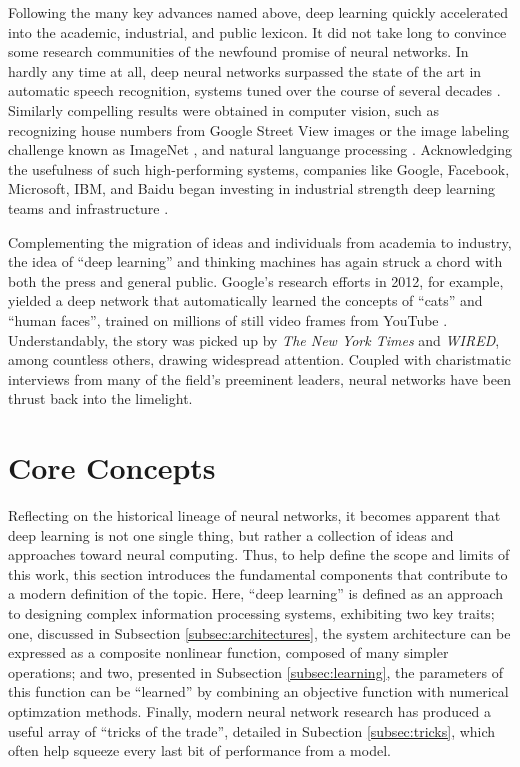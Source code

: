 Following the many key advances named above, deep learning quickly accelerated into the academic, industrial, and public lexicon.
It did not take long to convince some research communities of the newfound promise of neural networks.
In hardly any time at all, deep neural networks surpassed the state of the art in automatic speech recognition, systems tuned over the course of several decades \cite{Hinton2009}.
Similarly compelling results were obtained in computer vision, such as recognizing house numbers from Google Street View images \cite{} or the image labeling challenge known as ImageNet \cite{}, and natural languange processing \cite{Sutskever2010}.
Acknowledging the usefulness of such high-performing systems, companies like Google, Facebook, Microsoft, IBM, and Baidu began investing in industrial strength deep learning teams and infrastructure \cite{Dean2012, LeCun2014}.

Complementing the migration of ideas and individuals from academia to industry, the idea of ``deep learning'' and thinking machines has again struck a chord with both the press and general public.
Google's research efforts in 2012, for example, yielded a deep network that automatically learned the concepts of ``cats'' and ``human faces'', trained on millions of still video frames from YouTube \cite{Le2012}.
Understandably, the story was picked up by \emph{The New York Times} and \emph{WIRED}, among countless others, drawing widespread attention.
Coupled with charistmatic interviews from many of the field's preeminent leaders, neural networks have been thrust back into the limelight. %


\section{Core Concepts}
\label{sec:deep_core}

Reflecting on the historical lineage of neural networks, it becomes apparent that deep learning is not one single thing, but rather a collection of ideas and approaches toward neural computing.
Thus, to help define the scope and limits of this work, this section introduces the fundamental components that contribute to a modern definition of the topic.
Here, ``deep learning'' is defined as an approach to designing complex information processing systems, exhibiting two key traits;
one, discussed in Subsection \ref{subsec:architectures}, the system architecture can be expressed as a composite nonlinear function, composed of many simpler operations;
and two, presented in Subsection \ref{subsec:learning}, the parameters of this function can be ``learned'' by combining an objective function with numerical optimzation methods.
Finally, modern neural network research has produced a useful array of ``tricks of the trade'', detailed in Subection \ref{subsec:tricks}, which often help squeeze every last bit of performance from a model.


